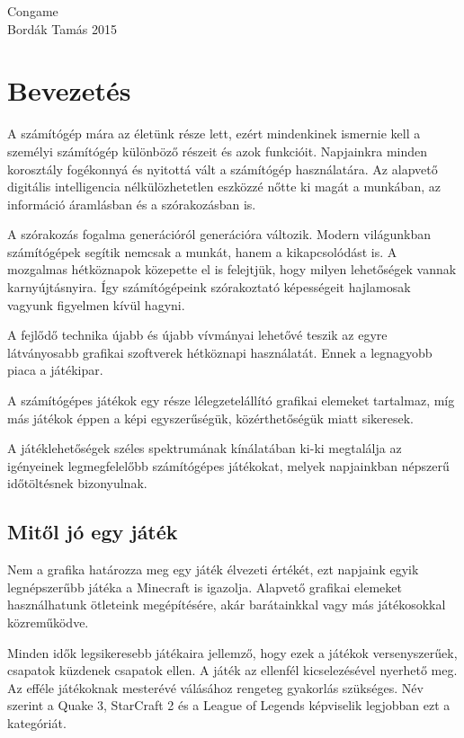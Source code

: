 \documentclass[bibliography=totocnumbered]{article}
\begin{document}
\begin{titlepage} 
	 \vfill {\huge Congame} \\[20pt] {\Large Bordák Tamás} \vfill  \vfill {\Large 2015} 
\end{titlepage}

\tableofcontents
\newpage
\section{Bevezetés}

A számítógép mára az életünk része lett, ezért mindenkinek ismernie kell
a személyi számítógép különböző részeit és azok funkcióit. Napjainkra
minden korosztály fogékonnyá és nyitottá vált a számítógép használatára.
Az alapvető digitális intelligencia nélkülözhetetlen eszközzé nőtte ki
magát a munkában, az információ áramlásban és a szórakozásban is.

A szórakozás fogalma generációról generációra változik. Modern
világunkban számítógépek segítik nemcsak a munkát, hanem a
kikapcsolódást is. A mozgalmas hétköznapok közepette el is felejtjük,
hogy milyen lehetőségek vannak karnyújtásnyira. Így számítógépeink
szórakoztató képességeit hajlamosak vagyunk figyelmen kívül hagyni.

A fejlődő technika újabb és újabb vívmányai lehetővé teszik az egyre
látványosabb grafikai szoftverek hétköznapi használatát. Ennek a
legnagyobb piaca a játékipar.

A számítógépes játékok egy része lélegzetelállító grafikai elemeket
tartalmaz, míg más játékok éppen a képi egyszerűségük, közérthetőségük
miatt sikeresek.

A játéklehetőségek széles spektrumának kínálatában ki-ki megtalálja az
igényeinek legmegfelelőbb számítógépes játékokat, melyek napjainkban
népszerű időtöltésnek bizonyulnak.


\subsection{ Mitől jó egy játék}

Nem a grafika határozza meg egy játék élvezeti értékét, ezt napjaink
egyik legnépszerűbb játéka a Minecraft is igazolja. Alapvető grafikai
elemeket használhatunk ötleteink megépítésére, akár barátainkkal vagy
más játékosokkal közreműködve.

Minden idők legsikeresebb játékaira jellemző, hogy ezek a játékok
versenyszerűek, csapatok küzdenek csapatok ellen. A játék az ellenfél
kicselezésével nyerhető meg. Az efféle játékoknak mesterévé válásához
rengeteg gyakorlás szükséges. Név szerint a Quake 3, StarCraft 2 és a
League of Legends képviselik legjobban ezt a kategóriát.
\end{document}
